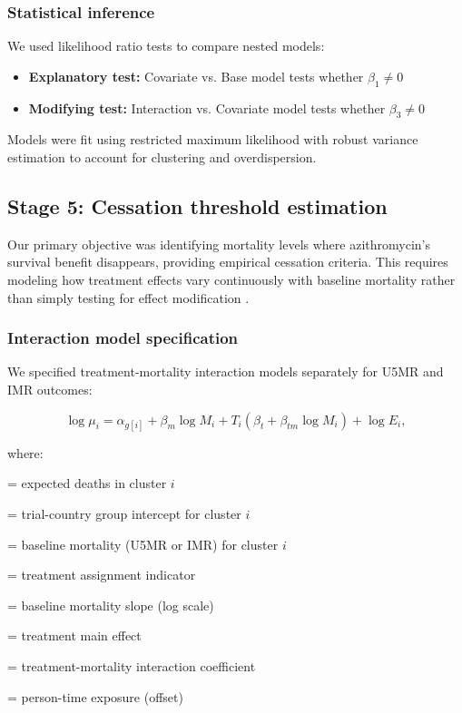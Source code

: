 \documentclass[11pt]{article}\usepackage[]{graphicx}\usepackage[]{xcolor}
\begin{document}
\subsubsection{Statistical inference}

We used likelihood ratio tests to compare nested models:
\begin{itemize}
\item \textbf{Explanatory test:} Covariate vs. Base model tests whether $\beta_1 \neq 0$
\item \textbf{Modifying test:} Interaction vs. Covariate model tests whether $\beta_3 \neq 0$
\end{itemize}

Models were fit using restricted maximum likelihood with robust variance estimation to account for clustering and overdispersion.

\subsection{Stage 5: Cessation threshold estimation}

Our primary objective was identifying mortality levels where azithromycin's survival benefit disappears, providing empirical cessation criteria. This requires modeling how treatment effects vary continuously with baseline mortality rather than simply testing for effect modification \citep{oron2020ajtmh}.

\subsubsection{Interaction model specification}

We specified treatment-mortality interaction models separately for U5MR and IMR outcomes:

\begin{equation}
\log \mu_i = \alpha_{g[i]} + \beta_m \log M_i + T_i(\beta_t + \beta_{tm} \log M_i) + \log E_i,
\end{equation}

\noindent where:
\begin{description}[leftmargin=2em]
\item[$\mu_i$] = expected deaths in cluster $i$
\item[$\alpha_{g[i]}$] = trial-country group intercept for cluster $i$
\item[$M_i$] = baseline mortality (U5MR or IMR) for cluster $i$
\item[$T_i$] = treatment assignment indicator
\item[$\beta_m$] = baseline mortality slope (log scale)
\item[$\beta_t$] = treatment main effect
\item[$\beta_{tm}$] = treatment-mortality interaction coefficient
\item[$E_i$] = person-time exposure (offset)
\end{description}
\end{document}
